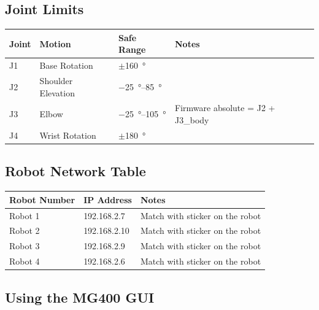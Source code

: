 \documentclass[11pt,a4paper]{article}
\begin{document}
\subsection{Joint Limits}

\begin{tabularx}{\linewidth}{@{}llXl@{}}
  \toprule
  \textbf{Joint} & \textbf{Motion} & \textbf{Safe Range} & \textbf{Notes} \\
  \midrule
  J1 & Base Rotation      & $\pm$\qty{160}{\degree}               & \\
  J2 & Shoulder Elevation & \qtyrange{-25}{85}{\degree}           & \\
  J3 & Elbow              & \qtyrange{-25}{105}{\degree}          & Firmware absolute = J2 + J3\_body \\
  J4 & Wrist Rotation     & $\pm$\qty{180}{\degree}               & \\
  \bottomrule
\end{tabularx}

\subsection{Robot Network Table}

\begin{tabularx}{\linewidth}{@{}llX@{}}
  \toprule
  \textbf{Robot Number} & \textbf{IP Address} & \textbf{Notes} \\
  \midrule
  Robot 1 & 192.168.2.7  & Match with sticker on the robot \\
  Robot 2 & 192.168.2.10 & Match with sticker on the robot \\
  Robot 3 & 192.168.2.9  & Match with sticker on the robot \\
  Robot 4 & 192.168.2.6  & Match with sticker on the robot \\
  \bottomrule
\end{tabularx}

\subsection{Using the MG400 GUI}
\end{document}
